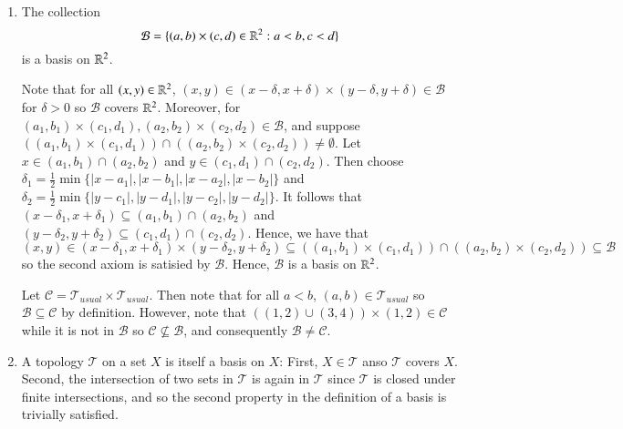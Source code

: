 \documentclass[12pt, a4paper, twoside, openright, titlepage]{book}
\begin{document}
\begin{eg}{}{}
\begin{enumerate}
\begin{proof*}{}{}
            \end{proof*}
        \item The collection \begin{equation*}
                \mathcal{B} = \{(a,b)\times (c,d) \in \mathbb R^2: a < b, c < d\}
        \end{equation*}
            is a basis on $\mathbb R^2$.
            \begin{proof*}{}{}
                Note that for all $(x,y) \in \mathbb R^2$, $(x,y) \in (x-\delta,x+\delta)\times (y-\delta,y+\delta) \in \mathcal{B}$ for $\delta > 0$ so $\mathcal{B}$ covers $\mathbb R^2$. Moreover, for $(a_1,b_1)\times (c_1,d_1),(a_2,b_2)\times(c_2,d_2) \in \mathcal{B}$, and suppose $((a_1,b_1)\times(c_1,d_1))\cap((a_2,b_2)\times(c_2,d_2)) \neq \emptyset$. Let $x \in (a_1,b_1) \cap(a_2,b_2)$ and $y \in (c_1,d_1)\cap(c_2,d_2)$. Then choose $\delta_1 = \frac{1}{2}\min\{|x-a_1|,|x-b_1|,|x-a_2|,|x-b_2|\}$ and $\delta_2 = \frac{1}{2}\min\{|y-c_1|,|y-d_1|,|y-c_2|,|y-d_2|\}$. It follows that $(x-\delta_1,x+\delta_1) \subseteq (a_1,b_1)\cap(a_2,b_2)$ and $(y-\delta_2,y+\delta_2)\subseteq (c_1,d_1)\cap(c_2,d_2)$. Hence, we have that $$(x,y) \in (x-\delta_1,x+\delta_1)\times(y-\delta_2,y+\delta_2) \subseteq ((a_1,b_1)\times(c_1,d_1))\cap((a_2,b_2)\times(c_2,d_2)) \subseteq \mathcal{B}$$ so the second axiom is satisied by $\mathcal{B}$. Hence, $\mathcal{B}$ is a basis on $\mathbb R^2$. 

                Let $\mathcal{C} = \mathcal{T}_{usual}\times\mathcal{T}_{usual}$. Then note that for all $a < b$, $(a,b) \in \mathcal{T}_{usual}$ so $\mathcal{B} \subseteq \mathcal{C}$ by definition. However, note that $((1,2)\cup(3,4)) \times (1,2) \in \mathcal{C}$ while it is not in $\mathcal{B}$ so $\mathcal{C} \nsubseteq \mathcal{B}$, and consequently $\mathcal{B} \neq \mathcal{C}$.
            \end{proof*}
            \item A topology $\mathcal{T}$ on a set $X$ is itself a basis on $X$: First, $X \in \mathcal{T}$ anso $\mathcal{T}$ covers $X$. Second, the intersection of two sets in $\mathcal{T}$ is again in $\mathcal{T}$ since $\mathcal{T}$ is closed under finite intersections, and so the second property in the definition of a basis is trivially satisfied. 
    \end{enumerate}
\end{eg}
\end{document}
